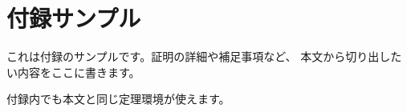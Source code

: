 \chapter{付録サンプル}
\label{app:sample}

これは付録のサンプルです。証明の詳細や補足事項など、
本文から切り出したい内容をここに書きます。

\begin{proposition}
付録内でも本文と同じ定理環境が使えます。
\end{proposition}
